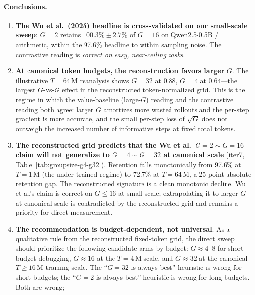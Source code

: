 \documentclass{article}
\begin{document}
\paragraph{Conclusions.}
\begin{enumerate}
  \item \textbf{The Wu et al.\ (2025) headline is cross-validated on our
        small-scale sweep}: $G{=}2$ retains $100.3\% \pm 2.7\%$ of
        $G{=}16$ on Qwen2.5-0.5B / arithmetic, within the 97.6\%
        headline to within sampling noise. The contrastive reading is
        \emph{correct on easy, near-ceiling tasks}.
  \item \textbf{At canonical token budgets, the reconstruction favors larger
        $G$}.
        The illustrative $T{=}64\,$M reanalysis shows $G{=}32$ at
        $0.88$, $G{=}4$ at $0.64$---the largest $G$-vs-$G$ effect in the
        reconstructed token-normalized grid. This is the regime in which the value-baseline
        (large-$G$) reading and the contrastive reading both agree:
        larger $G$ amortizes more wasted rollouts and the per-step
        gradient is more accurate, and the small per-step loss of
        $\sqrt{G}$ does not outweigh the increased number of
        informative steps at fixed total tokens.
  \item \textbf{The reconstructed grid predicts that the Wu et al.\
        $G{=}2{\sim}G{=}16$ claim will not generalize to
        $G{=}4{\sim}G{=}32$ at canonical scale}
        (iter7, Table~\ref{tab:groupsize-g4-g32}). Retention falls
        monotonically from 97.6\% at $T{=}1\,$M (the under-trained
        regime) to 72.7\% at $T{=}64\,$M, a 25-point absolute
        retention gap. The reconstructed signature is a clean monotonic
        decline. Wu et al.'s claim is
        correct on $G{\le}16$ at small scale; extrapolating it to
        larger $G$ at canonical scale is contradicted by the reconstructed
        grid and remains a priority for direct measurement.
  \item \textbf{The recommendation is budget-dependent, not universal}.
        As a qualitative rule from the reconstructed fixed-token grid,
        the direct sweep should prioritize the following candidate arms by budget:
        $G{\approx}4$--$8$ for short-budget debugging, $G{\approx}16$ at
        the $T{=}4\,$M scale, and $G{\approx}32$ at the canonical
        $T{\ge}16\,$M training scale. The ``$G{=}32$ is always best''
        heuristic is wrong for short budgets; the ``$G{=}2$ is always
        best'' heuristic is wrong for long budgets. Both are wrong;

\end{enumerate}
\end{document}
